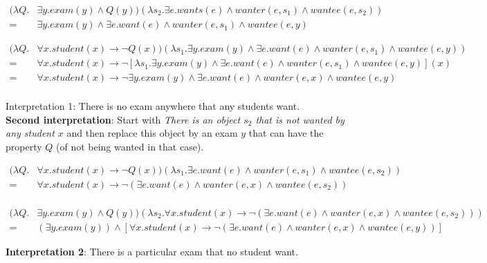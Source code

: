 \documentclass[12pt]{article}
\begin{document}
\begin{equation}
\begin{split}
	(\lambda Q.& \exists y. exam(y) \land Q(y))(\lambda s_2. \exists e. wants(e) \land wanter(e, s_1) \land wantee(e, s_2))\\ 
	=& \exists y. exam(y) \land \exists e. want(e) \land wanter(e, s_1) \land wantee(e, y) 
\end{split}
\end{equation}

\begin{equation}
\begin{split}
(\lambda Q.& \forall x. student(x)\rightarrow \neg Q(x))(\lambda s_1. \exists y. exam(y) \land \exists e. want(e) \land wanter(e, s_1) \land wantee(e, y)) \\
=& \forall x. student(x) \rightarrow \neg [\lambda s_1.\exists y. exam(y) \land \exists e. want(e) \land wanter(e, s_1) \land wantee(e, y)](x) \\
=& \forall x. student(x) \rightarrow \neg \exists y. exam(y) \land \exists e. want(e) \land wanter(e, x) \land wantee(e, y) \\
\end{split}
\end{equation}

Interpretation 1: There is no exam  anywhere that any students want.\\

\textbf{Second interpretation}: Start with \textit{There is an object $s_2$ that is not wanted by any student $x$} and then replace this object by an exam $y$ that can have the property $Q$ (of not being wanted in that case).

\begin{equation}
\begin{split}
(\lambda Q.& \forall x. student(x)\rightarrow \neg Q(x))(\lambda s_1. \exists e. want(e) \land wanter(e, s_1) \land wantee(e, s_2)) \\
=& \forall x. student(x) \rightarrow \neg (\exists e. want(e)\land wanter(e, x) \land wantee(e, s_2)) \\
\end{split}
\end{equation}

\begin{equation}
\begin{split}
(\lambda Q.& \exists y. exam(y) \land Q(y))(\lambda s_2. \forall x. student(x) \rightarrow \neg (\exists e. want(e)\land wanter(e, x) \land wantee(e, s_2)))\\ 
=& (\exists y. exam(y)) \land [\forall x. student(x) \rightarrow \neg (\exists e. want(e)\land wanter(e, x) \land wantee(e, y))]
\end{split}
\end{equation}

\textbf{Interpretation 2}: There is a particular exam that no student want. 
\end{document}

